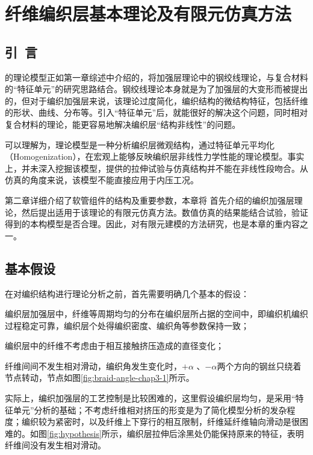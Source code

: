 
\chapter{纤维编织层基本理论及有限元仿真方法}


\section{引~言}


\hacite 的理论模型正如第一章综述中介绍的，将加强层理论中的钢绞线理论，与复合材料的“特征单元”的研究思路结合。钢绞线理论本身就是为了加强层的大变形而被提出的，但对于编织加强层来说，该理论过度简化，编织结构的微结构特征，包括纤维的形状、曲线、分布等。引入“特征单元”后，就能很好的解决这个问题，同时相对复合材料的理论，能更容易地解决编织层“结构非线性”的问题。

可以理解为，\ha 理论模型是一种分析编织层微观结构，通过特征单元平均化（Homogenization），在宏观上能够反映编织层非线性力学性能的理论模型。事实上，\ha 并未深入挖掘该模型，提供的拉伸试验与仿真结构并不能在非线性段吻合。从仿真的角度来说，该模型不能直接应用于内压工况。

第二章详细介绍了软管组件的结构及重要参数，本章将 首先介绍\ha  的编织加强层理论，然后提出适用于该理论的有限元仿真方法。数值仿真的结果能结合试验，验证得到的本构模型是否合理。因此，对有限元建模的方法研究，也是本章的重内容之一。



\section{基本假设}
在对编织结构进行理论分析之前，首先需要明确几个基本的假设：

\begin{compactenum}[\bf 假设1  ]
	\item 编织层加强层中，纤维等周期均匀的分布在编织层所占据的空间中，即编织机编织过程稳定可靠，编织层个处得编织密度、编织角等参数保持一致；
	\item 编织层中的纤维不考虑由于相互接触挤压造成的直径变化；
	\item 纤维间间不发生相对滑动，编织角发生变化时，$ +\alpha$  、$-\alpha $两个方向的钢丝只绕着节点转动，节点如图\ref{fig:braid-angle-chap3-1}所示。
\end{compactenum}

实际上，编织加强层的工艺控制是比较困难的，这里假设编织层均匀，是采用“特征单元”分析的基础；不考虑纤维相对挤压的形变是为了简化模型分析的发杂程度；编织较为紧密时，以及纤维上下穿行的相互限制，纤维延纤维轴向滑动是很困难的。如图\ref{fig:hypothesis}所示，编织层拉伸后涂黑处仍能保持原来的特征，表明纤维间没有发生相对滑动。

